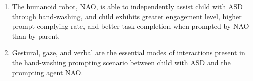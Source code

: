 \begin{enumerate}
	\item The humanoid robot, NAO, is able to independently assist child with ASD through hand-washing, and child exhibits greater engagement level, higher prompt complying rate, and better task completion when prompted by NAO than by parent.
	
	\item Gestural, gaze, and verbal are the essential modes of interactions present in the hand-washing prompting scenario between child with ASD and the prompting agent NAO.
	
	
\end{enumerate}
